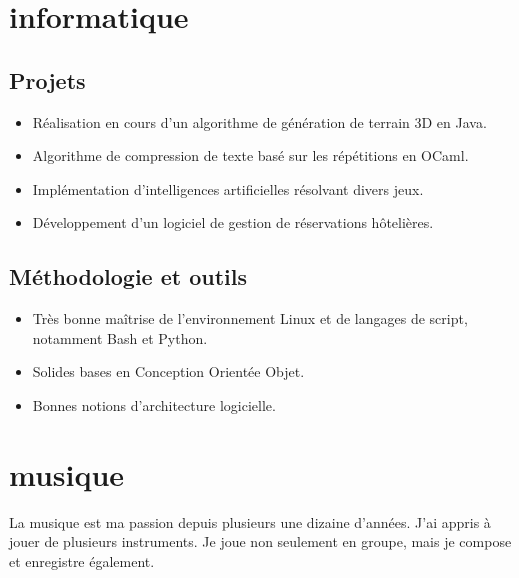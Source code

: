 \section{informatique}
\subsection{Projets}
    \begin{itemize}
        \item Réalisation en cours d'un algorithme de génération de terrain 3D
            en Java.
        \item Algorithme de compression de texte basé sur les répétitions en
            OCaml.
        \item Implémentation d'intelligences artificielles résolvant divers jeux.
        \item Développement d'un logiciel de gestion de réservations hôtelières.
    \end{itemize}
\subsection{Méthodologie et outils}
    \begin{itemize}
        \item Très bonne maîtrise de l'environnement Linux et de langages de
            script, notamment Bash et Python.
        \item Solides bases en Conception Orientée Objet.
        \item Bonnes notions d'architecture logicielle.
    \end{itemize}



\section{musique}
\vspace{-0.2cm}
La musique est ma passion depuis plusieurs une dizaine d'années.
J'ai appris à jouer de plusieurs instruments. Je joue non
seulement en groupe, mais je compose et enregistre également.
